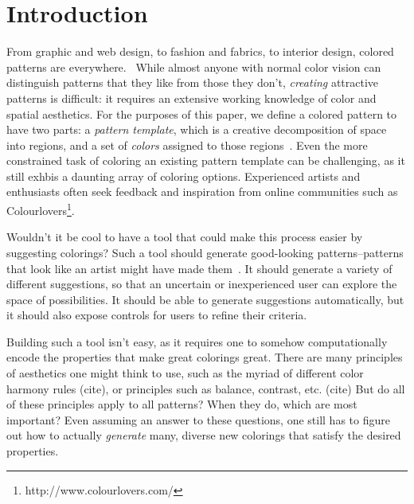 \section{Introduction}
\label{sec:introduction}

From graphic and web design, to fashion and fabrics, to interior design, colored patterns are everywhere.~ While almost anyone with normal color vision can distinguish patterns that they like from those they don't, \emph{creating} attractive patterns is difficult: it requires an extensive working knowledge of color and spatial aesthetics. For the purposes of this paper, we define a colored pattern to have two parts: a \emph{pattern template}, which is a creative decomposition of space into regions, and a set of \emph{colors} assigned to those regions~. Even the more constrained task of coloring an existing pattern template can be challenging, as it still exhbis a daunting array of coloring options. Experienced artists and enthusiasts often seek feedback and inspiration from online communities such as Colourlovers\footnote{http://www.colourlovers.com/}.

Wouldn't it be cool to have a tool that could make this process easier by suggesting colorings? Such a tool should generate good-looking patterns--patterns that look like an artist might have made them~. It should generate a variety of different suggestions, so that an uncertain or inexperienced user can explore the space of possibilities. It should be able to generate suggestions automatically, but it should also expose controls for users to refine their criteria.

Building such a tool isn't easy, as it requires one to somehow computationally encode the properties that make great colorings great. There are many principles of aesthetics one might think to use, such as the myriad of different color harmony rules (cite), or principles such as balance, contrast, etc. (cite) But do all of these principles apply to all patterns? When they do, which are most important? Even assuming an answer to these questions, one still has to figure out how to actually \emph{generate} many, diverse new colorings that satisfy the desired properties.

